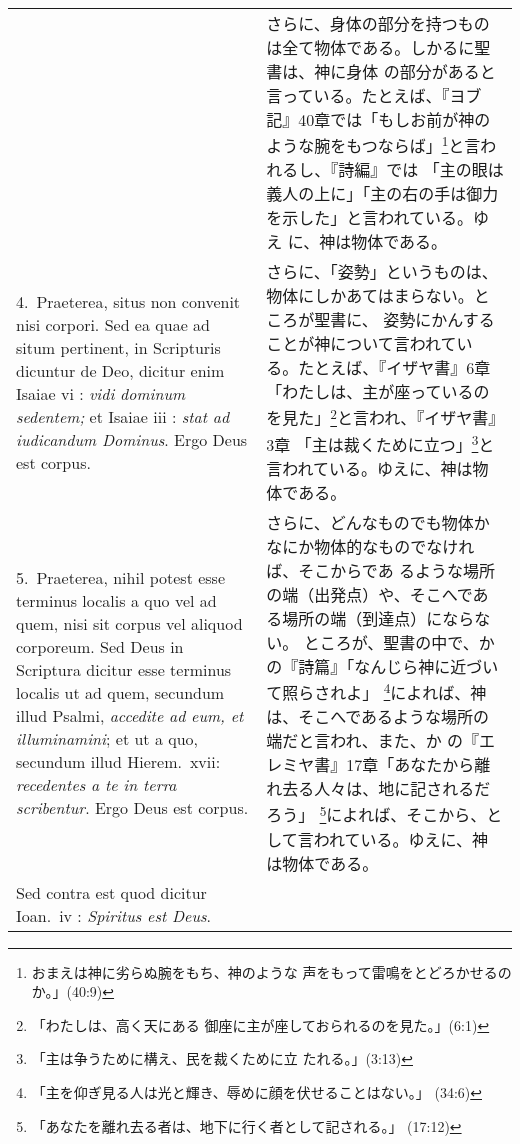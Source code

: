 \documentclass[10pt]{jsarticle}
\begin{document}
\begin{longtable}{p{21em}p{21em}}
&

さらに、身体の部分を持つものは全て物体である。しかるに聖書は、神に身体
の部分があると言っている。たとえば、『ヨブ記』40章では「もしお前が神の
ような腕をもつならば」\footnote{おまえは神に劣らぬ腕をもち、神のような
声をもって雷鳴をとどろかせるのか。」(40:9)}と言われるし、『詩編』では
「主の眼は義人の上に」「主の右の手は御力を示した」と言われている。ゆえ
に、神は物体である。

\\


4.~{\sc Praeterea}, situs non convenit nisi corpori. Sed ea quae ad
situm pertinent, in Scripturis dicuntur de Deo, dicitur enim Isaiae
{\sc vi} : {\it vidi dominum sedentem;} et Isaiae {\sc iii} : {\it
stat ad iudicandum Dominus}. Ergo Deus est corpus.

&

さらに、「姿勢」というものは、物体にしかあてはまらない。ところが聖書に、
姿勢にかんすることが神について言われている。たとえば、『イザヤ書』6章
「わたしは、主が座っているのを見た」\footnote{「わたしは、高く天にある
御座に主が座しておられるのを見た。」(6:1)}と言われ、『イザヤ書』3章
「主は裁くために立つ」\footnote{「主は争うために構え、民を裁くために立
たれる。」(3:13)}と言われている。ゆえに、神は物体である。

\\


5.~{\sc Praeterea}, nihil potest esse terminus localis a quo vel ad
quem, nisi sit corpus vel aliquod corporeum. Sed Deus in Scriptura
dicitur esse terminus localis ut ad quem, secundum illud Psalmi, {\it
accedite ad eum, et illuminamini}; et ut a quo, secundum illud
Hierem.~{\sc xvii}: {\it recedentes a te in terra scribentur}. Ergo
Deus est corpus.

 &

さらに、どんなものでも物体かなにか物体的なものでなければ、そこからであ
るような場所の端（出発点）や、そこへである場所の端（到達点）にならない。
ところが、聖書の中で、かの『詩篇』「なんじら神に近づいて照らされよ」
\footnote{「主を仰ぎ見る人は光と輝き、辱めに顔を伏せることはない。」
(34:6)}によれば、神は、そこへであるような場所の端だと言われ、また、か
の『エレミヤ書』17章「あなたから離れ去る人々は、地に記されるだろう」
\footnote{「あなたを離れ去る者は、地下に行く者として記される。」
(17:12)}によれば、そこから、として言われている。ゆえに、神は物体である。

\\



{\sc Sed contra est} quod dicitur Ioan.~{\sc iv} : {\it Spiritus est Deus}.


\end{longtable}
\end{document}
